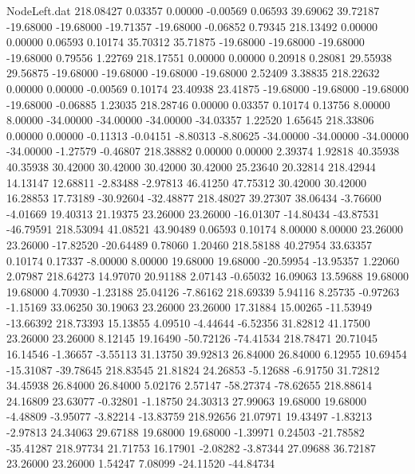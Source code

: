 \begin{filecontents}{NodeLeft.dat}
 218.08427    0.03357    0.00000    -0.00569    0.06593   39.69062   39.72187  -19.68000  -19.68000  -19.71357  -19.68000   -0.06852    0.79345
 218.13492    0.00000    0.00000     0.06593    0.10174   35.70312   35.71875  -19.68000  -19.68000  -19.68000  -19.68000    0.79556    1.22769
 218.17551    0.00000    0.00000     0.20918    0.28081   29.55938   29.56875  -19.68000  -19.68000  -19.68000  -19.68000    2.52409    3.38835
 218.22632    0.00000    0.00000    -0.00569    0.10174   23.40938   23.41875  -19.68000  -19.68000  -19.68000  -19.68000   -0.06885    1.23035
 218.28746    0.00000    0.03357     0.10174    0.13756    8.00000    8.00000  -34.00000  -34.00000  -34.00000  -34.03357    1.22520    1.65645
 218.33806    0.00000    0.00000    -0.11313   -0.04151   -8.80313   -8.80625  -34.00000  -34.00000  -34.00000  -34.00000   -1.27579   -0.46807
 218.38882    0.00000    0.00000     2.39374    1.92818   40.35938   40.35938   30.42000   30.42000   30.42000   30.42000   25.23640   20.32814
 218.42944   14.13147   12.68811    -2.83488   -2.97813   46.41250   47.75312   30.42000   30.42000   16.28853   17.73189  -30.92604  -32.48877
 218.48027   39.27307   38.06434    -3.76600   -4.01669   19.40313   21.19375   23.26000   23.26000  -16.01307  -14.80434  -43.87531  -46.79591
 218.53094   41.08521   43.90489     0.06593    0.10174    8.00000    8.00000   23.26000   23.26000  -17.82520  -20.64489    0.78060    1.20460
 218.58188   40.27954   33.63357     0.10174    0.17337   -8.00000    8.00000   19.68000   19.68000  -20.59954  -13.95357    1.22060    2.07987
 218.64273   14.97070   20.91188     2.07143   -0.65032   16.09063   13.59688   19.68000   19.68000    4.70930   -1.23188   25.04126   -7.86162
 218.69339    5.94116    8.25735    -0.97263   -1.15169   33.06250   30.19063   23.26000   23.26000   17.31884   15.00265  -11.53949  -13.66392
 218.73393   15.13855    4.09510    -4.44644   -6.52356   31.82812   41.17500   23.26000   23.26000    8.12145   19.16490  -50.72126  -74.41534
 218.78471   20.71045   16.14546    -1.36657   -3.55113   31.13750   39.92813   26.84000   26.84000    6.12955   10.69454  -15.31087  -39.78645
 218.83545   21.81824   24.26853    -5.12688   -6.91750   31.72812   34.45938   26.84000   26.84000    5.02176    2.57147  -58.27374  -78.62655
 218.88614   24.16809   23.63077    -0.32801   -1.18750   24.30313   27.99063   19.68000   19.68000   -4.48809   -3.95077   -3.82214  -13.83759
 218.92656   21.07971   19.43497    -1.83213   -2.97813   24.34063   29.67188   19.68000   19.68000   -1.39971    0.24503  -21.78582  -35.41287
 218.97734   21.71753   16.17901    -2.08282   -3.87344   27.09688   36.72187   23.26000   23.26000    1.54247    7.08099  -24.11520  -44.84734

\end{filecontents}
